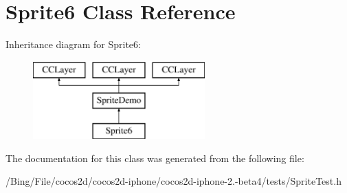 \hypertarget{interface_sprite6}{\section{Sprite6 Class Reference}
\label{interface_sprite6}
}
Inheritance diagram for Sprite6\-:\begin{figure}[H]
\begin{center}
\leavevmode
\includegraphics[height=3.000000cm]{interface_sprite6}
\end{center}
\end{figure}


The documentation for this class was generated from the following file\-:\begin{DoxyCompactItemize}
\item 
/\-Bing/\-File/cocos2d/cocos2d-\/iphone/cocos2d-\/iphone-\/2.-\/beta4/tests/Sprite\-Test.\-h\end{DoxyCompactItemize}
